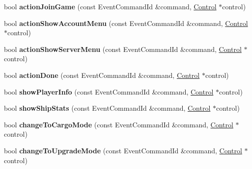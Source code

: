 \begin{DoxyCompactItemize}
\item 
bool {\bfseries action\+Join\+Game} (const Event\+Command\+Id \&command, \hyperlink{classControl}{Control} $\ast$control)\hypertarget{classBaseComputer_aaee38a47be407994c16ecbc278ba8f4d}{}\label{classBaseComputer_aaee38a47be407994c16ecbc278ba8f4d}

\item 
bool {\bfseries action\+Show\+Account\+Menu} (const Event\+Command\+Id \&command, \hyperlink{classControl}{Control} $\ast$control)\hypertarget{classBaseComputer_ac6159b611281c82a1117255503149dd3}{}\label{classBaseComputer_ac6159b611281c82a1117255503149dd3}

\item 
bool {\bfseries action\+Show\+Server\+Menu} (const Event\+Command\+Id \&command, \hyperlink{classControl}{Control} $\ast$control)\hypertarget{classBaseComputer_a893846ef8fde9720d7bb6a1f60de3bbd}{}\label{classBaseComputer_a893846ef8fde9720d7bb6a1f60de3bbd}

\item 
bool {\bfseries action\+Done} (const Event\+Command\+Id \&command, \hyperlink{classControl}{Control} $\ast$control)\hypertarget{classBaseComputer_aa92ebba95fa7f590bd88240efdd7a283}{}\label{classBaseComputer_aa92ebba95fa7f590bd88240efdd7a283}

\item 
bool {\bfseries show\+Player\+Info} (const Event\+Command\+Id \&command, \hyperlink{classControl}{Control} $\ast$control)\hypertarget{classBaseComputer_a9f9435b8ecd4d719045d3c604fc496a2}{}\label{classBaseComputer_a9f9435b8ecd4d719045d3c604fc496a2}

\item 
bool {\bfseries show\+Ship\+Stats} (const Event\+Command\+Id \&command, \hyperlink{classControl}{Control} $\ast$control)\hypertarget{classBaseComputer_a06de780101cc2c1eb186d29f08ae38ae}{}\label{classBaseComputer_a06de780101cc2c1eb186d29f08ae38ae}

\item 
bool {\bfseries change\+To\+Cargo\+Mode} (const Event\+Command\+Id \&command, \hyperlink{classControl}{Control} $\ast$control)\hypertarget{classBaseComputer_a65138f7b859a042d537fe561f2e6a433}{}\label{classBaseComputer_a65138f7b859a042d537fe561f2e6a433}

\item 
bool {\bfseries change\+To\+Upgrade\+Mode} (const Event\+Command\+Id \&command, \hyperlink{classControl}{Control} $\ast$control)\hypertarget{classBaseComputer_aad88e1caf1ba132ab6a1bcae10a4cbd3}{}\label{classBaseComputer_aad88e1caf1ba132ab6a1bcae10a4cbd3}


\end{DoxyCompactItemize}

